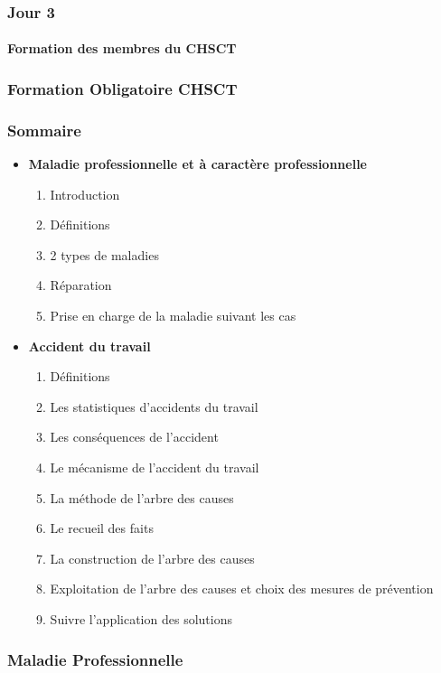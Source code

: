 \documentclass{beamer}
\begin{document}
\begin{frame}
\frametitle{Jour 3}
\framesubtitle{Formation des membres du CHSCT}
\end{frame}

\begin{frame}
\frametitle{Formation Obligatoire CHSCT}

\end{frame}


\begin{frame}
\frametitle{Sommaire}

\begin{itemize}
\item \textbf{Maladie professionnelle et à caractère professionnelle}
\begin{enumerate}
\item Introduction
\item Définitions
\item 2 types de maladies
\item Réparation 
\item Prise en charge de la maladie suivant les cas
\end{enumerate}
\item \textbf{Accident du travail}
\begin{enumerate}
\item Définitions
\item Les statistiques d’accidents du travail
\item Les conséquences de l'accident 
\item Le mécanisme de l’accident du travail
\item La méthode de l’arbre des causes
\item Le recueil des faits
\item La construction de l’arbre des causes
\item Exploitation de l’arbre des causes et choix des mesures de prévention
\item Suivre l’application des solutions
\end{enumerate}
\end{itemize}
\end{frame} 


\begin{frame}
\frametitle{Maladie Professionnelle}

\end{frame} 
\end{document}
